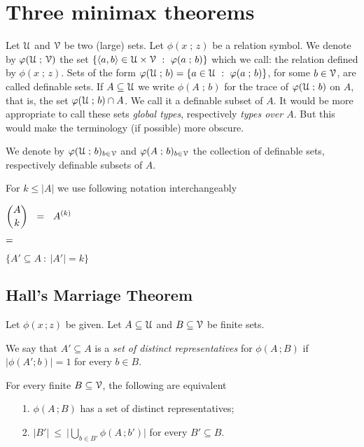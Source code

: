 \documentclass[scombinatorics.tex]{subfiles}
\begin{document}
\chapter{Three minimax theorems}
\label{minimax}



\def\medrel#1{\parbox[t]{6ex}{$\displaystyle\hfil #1$}}
\def\ceq#1#2#3{\parbox[t]{40ex}{$\displaystyle #1$}\medrel{#2}{$\displaystyle #3$}}

\def\separatore{\hfil o \rule[0.5ex]{4ex}{0.1ex} o \rule[0.5ex]{4ex}{0.1ex} o}





Let $\EuScript U$ and $\EuScript V$ be two (large) sets.
Let $\phi(x\;;\,z)$ be a relation symbol.
We denote by $\varphi(\EuScript U\;;\,\EuScript V)$ the set $\{\<a,b\>\in\U\times\V\ :\ \phi(a\;;\,b)\}$ which we call: the relation defined by $\phi(x\;;\,z)$.
Sets of the form $\phi(\U\;;\,b)=\{a\in\U\ :\ \phi(a\;;\,b)\}$, for some $b\in\EuScript V$, are called definable sets.
If $A\subseteq\EuScript U$ we write $\phi(A\;;\,b)$ for the trace of $\varphi(\EuScript U\;;\,b)$ on $A$, that is, the set $\varphi(\EuScript U\;;\,b)\cap A$.
We call it a definable subset of $A$.
It would be more appropriate to call these sets \textit{global types}, respectively \textit{types over $A$}.
But this would make the terminology (if possible) more obscure.

We denote by $\varphi(\EuScript U\;;\,b)_{b\in\EuScript V}$ and $\varphi(A\;;\,b)_{b\in\EuScript V}$ the collection of definable sets, respectively definable subsets of $A$.

For $k\le|A|$ we use following notation interchangeably

\ceq{\hfill{A\choose k}\medrel{=}A^{(k)}}
{=}
{\Big\{A'\subseteq A\ :\ |A'|=k \Big\}}


\section{Hall's Marriage Theorem}\label{marriage}

\def\ceq#1#2#3{\parbox[t]{30ex}{$\displaystyle #1$}\medrel{#2}{$\displaystyle #3$}}

Let $\phi(x\,;z)$ be given. 
Let $A\subseteq\EuScript U$ and $B\subseteq\EuScript V$ be finite sets. 

We say that $A'\subseteq A$ is a \emph{set of distinct representatives\/} for $\phi(A\,;B)$ if  $|\phi(A';b)|=1$ for every $b\in B$.

\begin{void_thm}\label{thm_marriage}
   For every finite $B\subseteq\EuScript V$, the following are equivalent
   \begin{itemize}
   \item[1.] $\phi(A\,;B)$ has a set of distinct representatives;

   \item[2.] $\displaystyle|B'|\ \le\ \bigg|\bigcup_{b\in B'}\phi(A\,;b')\bigg|$ for every $B'\subseteq B$.
   \end{itemize}
\end{void_thm}
\end{document}
